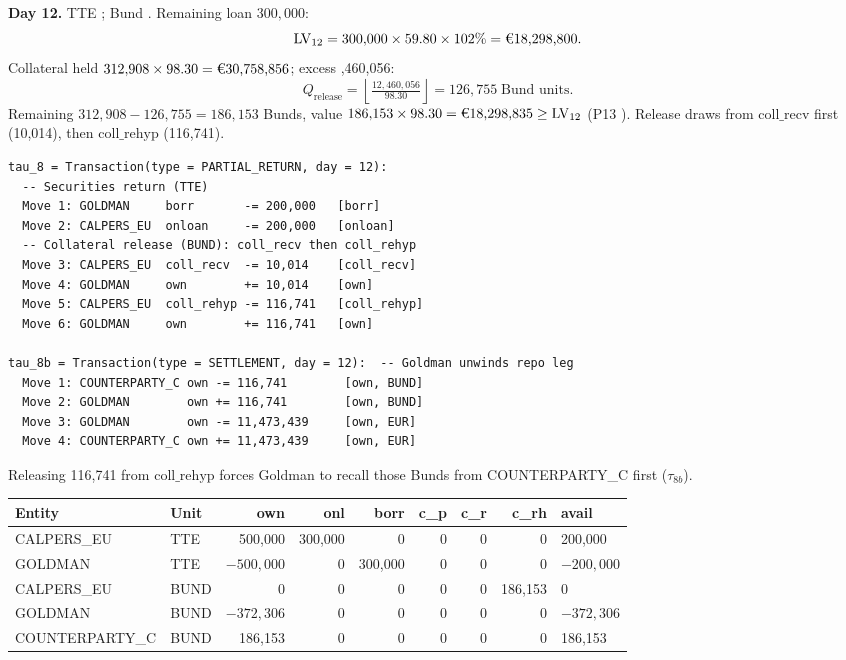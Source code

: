 \documentclass[11pt,a4paper]{article}
\newcommand{\EUR}[1]{\mbox{\texteuro#1}}
\begin{document}
\noindent\textbf{Day 12.} TTE \EUR{59.80}; Bund \EUR{98.30}. Remaining loan $300{,}000$:
\[
\mathrm{LV}_{12} = 300{,}000 \times 59.80 \times 102\% = \text{\EUR{18,298,800}}.
\]
Collateral held $312{,}908 \times 98.30 = \text{\EUR{30,758,856}}$; excess \EUR{12,460,056}:
\[
Q_{\mathrm{release}} = \left\lfloor \tfrac{12{,}460{,}056}{98.30} \right\rfloor = 126{,}755 \;\text{Bund units}.
\]
Remaining $312{,}908 - 126{,}755 = 186{,}153$ Bunds, value $186{,}153 \times 98.30 = \text{\EUR{18,298,835}} \geq \mathrm{LV}_{12}$ (P13 \checkmark). Release draws from $\mathrm{coll\_recv}$ first (10{,}014), then $\mathrm{coll\_rehyp}$ (116{,}741).

\begin{lstlisting}
tau_8 = Transaction(type = PARTIAL_RETURN, day = 12):
  -- Securities return (TTE)
  Move 1: GOLDMAN     borr       -= 200,000   [borr]
  Move 2: CALPERS_EU  onloan     -= 200,000   [onloan]
  -- Collateral release (BUND): coll_recv then coll_rehyp
  Move 3: CALPERS_EU  coll_recv  -= 10,014    [coll_recv]
  Move 4: GOLDMAN     own        += 10,014    [own]
  Move 5: CALPERS_EU  coll_rehyp -= 116,741   [coll_rehyp]
  Move 6: GOLDMAN     own        += 116,741   [own]

tau_8b = Transaction(type = SETTLEMENT, day = 12):  -- Goldman unwinds repo leg
  Move 1: COUNTERPARTY_C own -= 116,741        [own, BUND]
  Move 2: GOLDMAN        own += 116,741        [own, BUND]
  Move 3: GOLDMAN        own -= 11,473,439     [own, EUR]
  Move 4: COUNTERPARTY_C own += 11,473,439     [own, EUR]
\end{lstlisting}

\noindent Releasing 116{,}741 from $\mathrm{coll\_rehyp}$ forces Goldman to recall those Bunds from COUNTERPARTY\_C first ($\tau_{8b}$).

\begin{center}\small
\begin{tabular}{l l r r r r r r l}
\toprule
\textbf{Entity} & \textbf{Unit} & own & onl & borr & c\_p & c\_r & c\_rh & avail \\
\midrule
CALPERS\_EU & TTE & 500{,}000 & 300{,}000 & 0 & 0 & 0 & 0 & 200{,}000 \\
GOLDMAN & TTE & $-500{,}000$ & 0 & 300{,}000 & 0 & 0 & 0 & $-200{,}000$ \\
CALPERS\_EU & BUND & 0 & 0 & 0 & 0 & 0 & 186{,}153 & 0 \\
GOLDMAN & BUND & $-372{,}306$ & 0 & 0 & 0 & 0 & 0 & $-372{,}306$ \\
COUNTERPARTY\_C & BUND & 186{,}153 & 0 & 0 & 0 & 0 & 0 & 186{,}153 \\
\bottomrule
\end{tabular}
\end{center}
\end{document}
